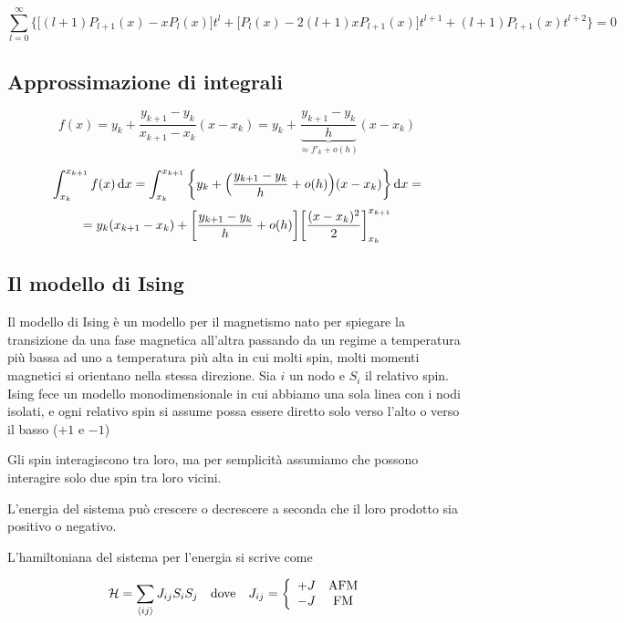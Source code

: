 $$\sum_{l=0}^{\infty} \Big\{ \big[ (l+1)P_{l+1}(x) - xP_l(x) \big] t^l + \big[ P_l(x) -2(l+1)xP_{l+1}(x) \big]t^{l+1} + (l+1)P_{l+1}(x)t^{l+2} \Big\}=0$$

\subsection{Approssimazione di integrali}

$$f(x)=y_k + \frac{y_{k+1} - y_k}{x_{k+1} - x_k} (x - x_k)
=y_k + \underbrace{\frac{y_{k+1} - y_k}{h}}_{\approx f'_k + o(h)} (x - x_k)$$

$$\int_{x_k}^{x_{k+1}} f(x) \dd{x}
=\int_{x_k}^{x_{k+1}} \qty{ y_k + \Big( \frac{y_{k+1} - y_k}{h} + o(h) \Big)(x - x_k) } \dd{x}=$$
$$=y_k(x_{k+1} - x_k) + \qty[ \frac{y_{k+1} - y_k}{h} + o(h) ]\qty[ \frac{(x - x_k)^2}{2} ]_{x_k}^{x_{k+1}}$$

\subsection{Il modello di Ising}

Il modello di Ising è un modello per il magnetismo nato per spiegare la transizione da una fase magnetica all'altra passando da un regime a temperatura più bassa ad uno a temperatura più alta in cui molti spin, molti momenti magnetici si orientano nella stessa direzione. Sia $i$ un nodo e $S_i$ il relativo spin. Ising fece un modello monodimensionale in cui abbiamo una sola linea con i nodi isolati, e ogni relativo spin si assume possa essere diretto solo verso l'alto o verso il basso ($+1$ e $-1$)

\begin{center}
\end{center}

Gli spin interagiscono tra loro, ma per semplicità assumiamo che possono interagire solo due spin tra loro vicini.

L'energia del sistema può crescere o decrescere a seconda che il loro prodotto sia positivo o negativo.

L'hamiltoniana del sistema per l'energia si scrive come

$$\mathcal{H}=\sum_{\expval{ij}} J_{ij} S_i S_j
\quad\text{dove}\quad
J_{ij}=\left\{
   \begin{array}{lc}
      +J & \rm AFM\\
      -J & \rm FM
   \end{array}
\right.$$

